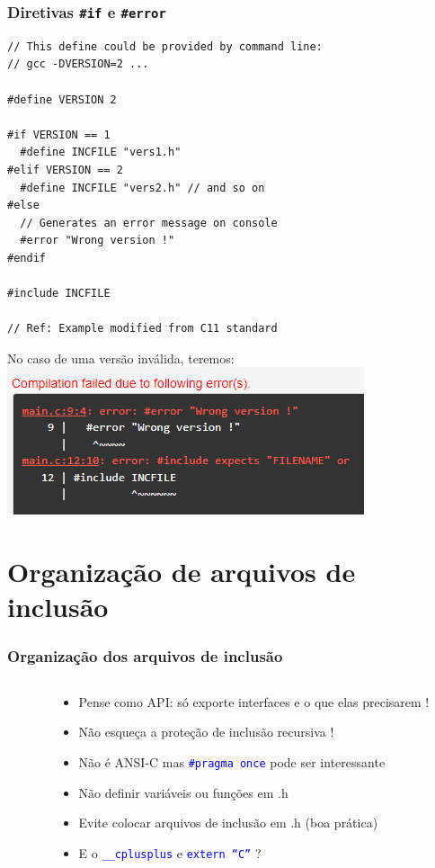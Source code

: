 \documentclass{beamer}
\begin{document}
\begin{frame}[fragile]
	\frametitle{Diretivas \texttt{\#if} e \texttt{\#error}}

	\begin{lstlisting}[style=customc]
// This define could be provided by command line:
// gcc -DVERSION=2 ...

#define VERSION 2

#if VERSION == 1
  #define INCFILE "vers1.h"
#elif VERSION == 2
  #define INCFILE "vers2.h" // and so on
#else
  // Generates an error message on console
  #error "Wrong version !"
#endif

#include INCFILE

// Ref: Example modified from C11 standard
	\end{lstlisting}
    No caso de uma versão inválida, teremos: \\
    \includegraphics[scale=0.5]{imgs/error.png}
\end{frame}

\section{Organização de arquivos de inclusão}

\begin{frame}
	\frametitle{Organização dos arquivos de inclusão}
	\begin{columns}[T] %
		\begin{column}{.450\textwidth}
			
		\end{column}%
		\hfill%
		\begin{column}{.55\textwidth}
			\begin{itemize}
				\item Pense como API: só exporte interfaces e o que elas precisarem !
				\item Não esqueça a proteção de inclusão recursiva !
				\item Não é ANSI-C mas \texttt{\textcolor{blue}{\#pragma once}} pode ser interessante
				\item Não definir variáveis ou funções em .h
				\item Evite colocar arquivos de inclusão em .h (boa prática)
                \item E o \texttt{\textcolor{blue}{\_\_cplusplus}} e \texttt{\textcolor{blue}{extern ``C''}} ?
			\end{itemize}
		\end{column}%
	\end{columns}
\end{frame}
\end{document}
